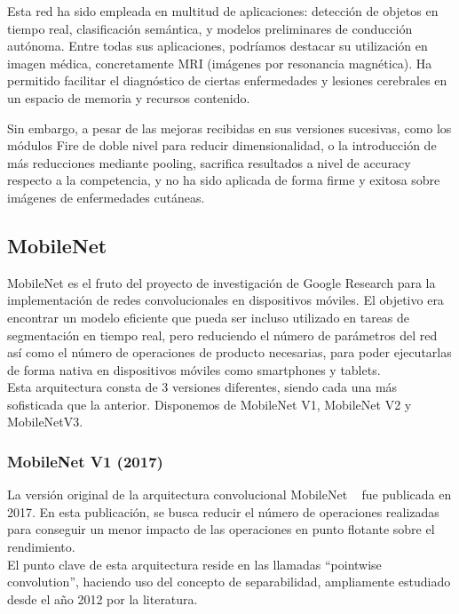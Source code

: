 Esta red ha sido empleada en multitud de aplicaciones: detección de objetos en tiempo real, clasificación semántica, y modelos preliminares de conducción autónoma. Entre todas sus aplicaciones, podríamos destacar su utilización en imagen médica, concretamente MRI (imágenes por resonancia magnética). Ha permitido facilitar el diagnóstico de ciertas enfermedades y lesiones cerebrales en un espacio de memoria y recursos contenido.

Sin embargo, a pesar de las mejoras recibidas en sus versiones sucesivas, como los módulos Fire de doble nivel para reducir dimensionalidad, o la introducción de más reducciones mediante pooling, sacrifica resultados a nivel de accuracy respecto a la competencia, y no ha sido aplicada de forma firme y exitosa sobre imágenes de enfermedades cutáneas.



\subsection{MobileNet}
\label{cap:mobile}

MobileNet es el fruto del proyecto de investigación de Google Research para la implementación de redes convolucionales en dispositivos móviles. El objetivo era encontrar un modelo eficiente que pueda ser incluso utilizado en tareas de segmentación en tiempo real, pero reduciendo el número de parámetros del red así como el número de operaciones de producto necesarias, para poder ejecutarlas de forma nativa en dispositivos móviles como smartphones y tablets.\\

Esta arquitectura consta de 3 versiones diferentes, siendo cada una más sofisticada que la anterior. Disponemos de MobileNet V1, MobileNet V2 y MobileNetV3.

\subsubsection{MobileNet V1 (2017)}

La versión original de la arquitectura convolucional MobileNet  ~\cite{howard2017mobilenets} fue publicada en 2017. En esta publicación, se busca reducir el número de operaciones realizadas para conseguir un menor impacto de las operaciones en punto flotante sobre el rendimiento.\\
El punto clave de esta arquitectura reside en las llamadas ``pointwise convolution'', haciendo uso del concepto de separabilidad, ampliamente estudiado desde el año 2012 por la literatura.

